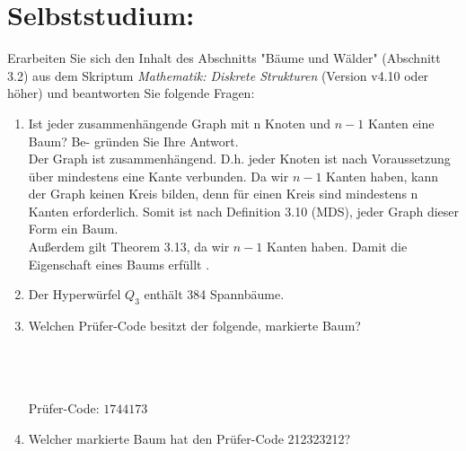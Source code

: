     \section*{Selbststudium:}
        Erarbeiten Sie sich den Inhalt des Abschnitts "Bäume und Wälder" (Abschnitt 3.2) aus dem
        Skriptum \textit{Mathematik: Diskrete Strukturen} (Version v4.10 oder höher) und beantworten Sie
        folgende Fragen:
    \begin{enumerate}[label=(\alph*)]
        \item Ist jeder zusammenhängende Graph mit n Knoten und $n - 1$ Kanten eine Baum? Be-
        gründen Sie Ihre Antwort.\\
        Der Graph ist zusammenhängend. D.h. jeder Knoten ist nach Voraussetzung über mindestens eine Kante verbunden. Da wir $n-1$ Kanten haben, kann der Graph keinen Kreis bilden, denn für einen Kreis sind mindestens n Kanten erforderlich. Somit ist nach Definition 3.10 (MDS), jeder Graph dieser Form ein Baum. 
        \\ Außerdem gilt Theorem 3.13, da wir $n-1$ Kanten haben. Damit die Eigenschaft eines Baums erfüllt .

        \item Der Hyperwürfel $Q_3$ enthält 384 Spannbäume. %

        \item Welchen Prüfer-Code besitzt der folgende, markierte Baum?\\\\
        \\\\
        Prüfer-Code: $1744173$

        \item Welcher markierte Baum hat den Prüfer-Code 212323212?\\\\
\end{enumerate}

